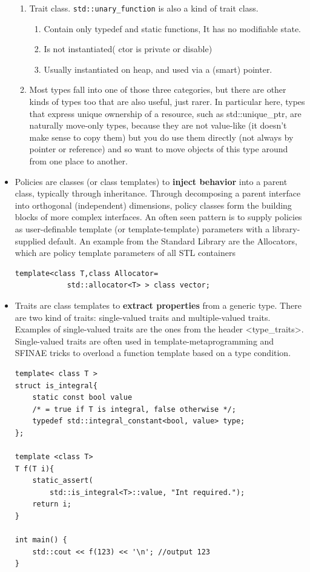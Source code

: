 \documentclass[a4paper,11pt,twoside]{book}
\begin{document}
\begin{itemize}
\begin{enumerate}
		\item Trait class. \texttt{std::unary\_function} is also a kind of trait class. 
		\begin{enumerate}
			\item Contain only typedef and static functions, It has no modifiable state.
			\item Is not instantiated( ctor is private or disable)
			\item Usually instantiated on heap, and used via a (smart) pointer.
		\end{enumerate}
	
		\item Most types fall into one of those three categories, but there are other kinds of types too that are also useful, just rarer. In particular here, types that express unique ownership of a resource, such as std::unique\_ptr, are naturally move-only types, because they are not value-like (it doesn't make sense to copy them) but you do use them directly (not always by pointer or reference) and so want to move objects of this type around from one place to another.	
	
	\end{enumerate}
	
	\item Policies are classes (or class templates) to \textbf{inject behavior} into a parent class, typically through inheritance. Through decomposing a parent interface into orthogonal (independent) dimensions, policy classes form the building blocks of more complex interfaces. An often seen pattern is to supply policies as user-definable template (or template-template) parameters with a library-supplied default. An example from the Standard Library are the Allocators, which are policy template parameters of all STL containers
\begin{lstlisting}[numbers=none]
template<class T,class Allocator=
			std::allocator<T> > class vector;
\end{lstlisting}
	
	\item Traits are class templates to \textbf{extract properties} from a generic type. There are two kind of traits: single-valued traits and multiple-valued traits. Examples of single-valued traits are the ones from the header <type\_traits>. Single-valued traits are often used in template-metaprogramming and SFINAE tricks to overload a function template based on a type condition.
	\begin{lstlisting}[numbers=none]
template< class T >
struct is_integral{
	static const bool value
	/* = true if T is integral, false otherwise */;
	typedef std::integral_constant<bool, value> type;
};
	
template <class T>
T f(T i){
	static_assert(
		std::is_integral<T>::value, "Int required.");
	return i;
}

int main() {
	std::cout << f(123) << '\n'; //output 123
}
\end{lstlisting}
\end{itemize}
\end{document}
